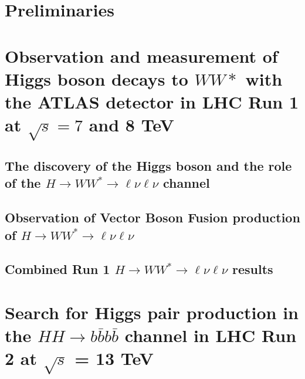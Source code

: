 \documentclass{Dissertate}
\begin{document}


\maketitle
\copyrightpage

\abstractpage
\tableofcontents
\listoffigures
\listoftables
\dedicationpage
\acknowledgments

\doublespacing

\newcommand\HWWfull          {$H\rightarrow WW^{*}\rightarrow \ell\nu\ell\nu$ }


\setcounter{chapter}{-1}  %

\part{Preliminaries}


\part{Observation and measurement of Higgs boson decays to $WW*$ with
  the ATLAS detector in LHC Run 1 at $\sqrt{s} = 7$ and 8 TeV}



\chapter{The discovery of the Higgs boson and the role of the $H\rightarrow WW^{*}\rightarrow \ell\nu\ell\nu$ channel}

\chapter{Observation of Vector Boson Fusion production of $H\rightarrow WW^{*}\rightarrow \ell\nu\ell\nu$}

\chapter{Combined Run 1 $H\rightarrow WW^{*}\rightarrow \ell\nu\ell\nu$ results}

\part{Search for Higgs pair production in the $HH\rightarrow
  b\bar{b}b\bar{b}$ channel in LHC Run 2 at $\sqrt{s}$ = 13 TeV}
\end{document}
